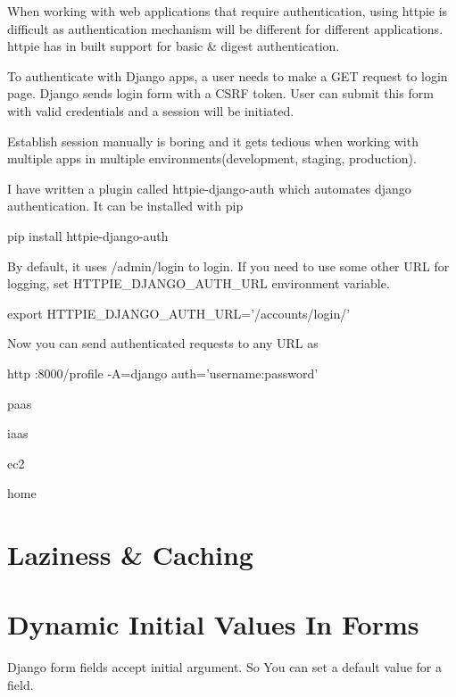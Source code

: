 \documentclass[letterpaper,11pt,english]{sphinxmanual}
\begin{document}
When working with web applications that require authentication, using httpie is difficult as authentication mechanism will be different for different applications. httpie has in built support for basic \& digest authentication.

To authenticate with Django apps, a user needs to make a GET request to login page. Django sends login form with a CSRF token. User can submit this form with valid credentials and a session will be initiated.

Establish session manually is boring and it gets tedious when working with multiple apps in multiple environments(development, staging, production).

I have written a plugin called httpie-django-auth which automates django authentication. It can be installed with pip

pip install httpie-django-auth

By default, it uses /admin/login to login. If you need to use some other URL for logging, set HTTPIE\_DJANGO\_AUTH\_URL environment variable.

export HTTPIE\_DJANGO\_AUTH\_URL=’/accounts/login/’

Now you can send authenticated requests to any URL as

http :8000/profile -A=django \textendash{}auth=’username:password’

paas

iaas

ec2

home


\chapter{Laziness \& Caching}
\label{\detokenize{misc_eager_lazy:laziness-caching}}\label{\detokenize{misc_eager_lazy::doc}}

\chapter{Dynamic Initial Values In Forms}
\label{\detokenize{misc_gotcha_initial:dynamic-initial-values-in-forms}}\label{\detokenize{misc_gotcha_initial::doc}}
Django form fields accept initial argument. So You can set a default value for a field.
\end{document}
